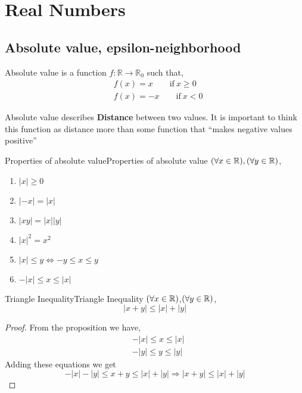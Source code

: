 \chapter{Real Numbers}
\section{Absolute value, epsilon-neighborhood}
Absolute value is a function $f: \mathbb{R} \rightarrow \mathbb{R}_0$ such that,
\begin{align*}
    & f(x) = x \qquad \text{if} \ x \ge 0 \\
    & f(x) = -x \qquad \text{if} \ x < 0
\end{align*}

Absolute value describes \textbf{Distance} between two values. It is
important to think this function as distance more than some function
that ``makes negative values positive''

\begin{prop}{Properties of absolute value}{Properties of absolute value}
    $(\forall x \in {\mathbb{R}}),(\forall y \in {\mathbb{R}})$,
    \begin{enumerate}
        \item $ |x| \ge 0$
        \item $|-x| = |x|$
        \item $|xy| =|x||y|$
        \item $|x|^2= x^2$
        \item $|x| \le y \iff -y \le x \le y$
        \item $-|x| \le x \le |x|$
    \end{enumerate}
\end{prop}

\begin{theo}{Triangle Inequality}{Triangle Inequality}
    $(\forall x \in {\mathbb{R}})$,$(\forall y \in {\mathbb{R}})$,
    \[ |x+y| \le |x| + |y| \]
    \tcblower
    \begin{proof}
        From the proposition we have,
        \begin{align*}
            & -|x| \le x  \le |x| \\
            & -|y| \le y \le |y|
        \end{align*}
        Adding these equations we get
        \[  -|x| -|y| \le x+y \le |x| +|y| \Rightarrow |x+y| \le |x| + |y|\]
    \end{proof}
\end{theo}

